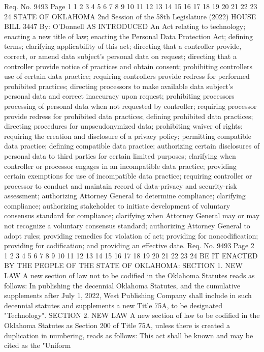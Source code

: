 Req. No. 9493 Page 1
1
2
3
4
5
6
7
8
9
10
11
12
13
14
15
16
17
18
19
20
21
22
23
24
STATE OF OKLAHOMA
2nd Session of the 58th Legislature (2022)
HOUSE BILL 3447 By: O'Donnell
AS INTRODUCED
An Act relating to technology; enacting a new title
of law; enacting the Personal Data Protection Act;
defining terms; clarifying applicability of this act;
directing that a controller provide, correct, or
amend data subject's personal data on request;
directing that a controller provide notice of
practices and obtain consent; prohibiting controllers
use of certain data practice; requiring controllers
provide redress for performed prohibited practices;
directing processors to make available data subject's
personal data and correct inaccuracy upon request;
prohibiting processors processing of personal data
when not requested by controller; requiring processor
provide redress for prohibited data practices;
defining prohibited data practices; directing
procedures for unpseudonymized data; prohibiting
waiver of rights; requiring the creation and
disclosure of a privacy policy; permitting compatible
data practice; defining compatible data practice;
authorizing certain disclosures of personal data to
third parties for certain limited purposes;
clarifying when controller or processor engages in an
incompatible data practice; providing certain
exemptions for use of incompatible data practice;
requiring controller or processor to conduct and
maintain record of data-privacy and security-risk
assessment; authorizing Attorney General to determine
compliance; clarifying compliance; authorizing
stakeholder to initiate development of voluntary
consensus standard for compliance; clarifying when
Attorney General may or may not recognize a voluntary
consensus standard; authorizing Attorney General to
adopt rules; providing remedies for violation of act;
providing for noncodification; providing for
codification; and providing an effective date.
Req. No. 9493 Page 2
1
2
3
4
5
6
7
8
9
10
11
12
13
14
15
16
17
18
19
20
21
22
23
24
BE IT ENACTED BY THE PEOPLE OF THE STATE OF OKLAHOMA:
SECTION 1. NEW LAW A new section of law not to be
codified in the Oklahoma Statutes reads as follows:
In publishing the decennial Oklahoma Statutes, and the
cumulative supplements after July 1, 2022, West Publishing Company
shall include in such decennial statutes and supplements a new Title
75A, to be designated "Technology".
SECTION 2. NEW LAW A new section of law to be codified
in the Oklahoma Statutes as Section 200 of Title 75A, unless there
is created a duplication in numbering, reads as follows:
This act shall be known and may be cited as the "Uniform
